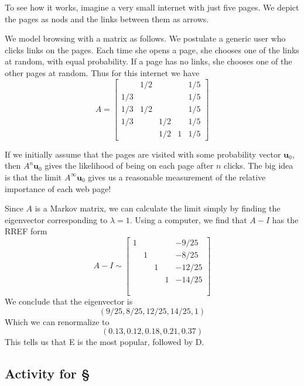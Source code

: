 \documentclass[11pt,oneside]{amsbook}
\theoremstyle{definition}
\theoremstyle{plain}
\theoremstyle{definition}
\theoremstyle{remark}
\numberwithin{equation}{section}
\numberwithin{figure}{section}
\begin{document}
To see how it works, imagine a very small internet with just five pages. We depict the pages as nods and the links between them as arrows.
\begin{center}
\end{center}

We model browsing with a matrix as follows. We postulate a generic user who clicks links on the pages. Each time she opens a page, she chooses one of the links at random, with equal probability. If a page has no links, she chooses one of the other pages at random. Thus for this internet we have
\[A=\begin{bmatrix}
    &1/2&&&1/5\\
    1/3&&&&1/5\\
    1/3&1/2&&&1/5\\
    1/3&&1/2&&1/5\\
    &&1/2&1&1/5
  \end{bmatrix}
\]

If we initially assume that the pages are visited with some probability vector $\mathbf{u}_0$, then $A^n\mathbf{u}_0$ gives the likelihood of being on each page after $n$ clicks. The big idea is that the limit $A^\infty\mathbf{u}_0$ gives us a reasonable measurement of the relative importance of each web page!

Since $A$ is a Markov matrix, we can calculate the limit simply by finding the eigenvector corresponding to $\lambda=1$. Using a computer, we find that $A-I$ has the RREF form
\[A-I\sim\begin{bmatrix}
    1&&&&-9/25\\
    &1&&&-8/25\\
    &&1&&-12/25\\
    &&&1&-14/25\\
    \phantom{1}
  \end{bmatrix}
\]
We conclude that the eigenvector is
\[(9/25,8/25,12/25,14/25,1)
\]
Which we can renormalize to
\[(0.13,0.12,0.18,0.21,0.37)
\]
This tells us that E is the most popular, followed by D.

\newpage
\subsection*{Activity for \S \thesection}
\end{document}
